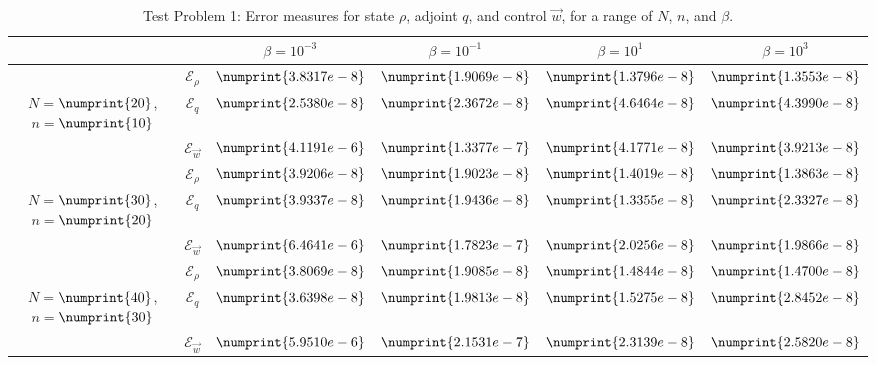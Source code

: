 \documentclass[11pt, a4paper]{article}
\theoremstyle{definition}
\newcommand{\adj}{q}
\begin{document}
	\begin{table}
		\begin{tabular}{ | c | c || c | c | c | c ||}
			\hline
			\multicolumn{2}{|c||}{} & $\beta = 10^{-3}$ & $\beta = 10^{-1}$ & $\beta = 10^{1}$ & $\beta = 10^{3}$  \\
			\hline
			\hline
			& $\mathcal{E}_\rho$ & $\numprint{3.8317e-8}$ & $\numprint{1.9069e-8}$ & $\numprint{1.3796e-8}$ & $\numprint{1.3553e-8}$ \\
			$N = $$\numprint{20}$, $n = $$\numprint{10}$  & $\mathcal{E}_\adj$ & $\numprint{2.5380e-8}$ & $\numprint{2.3672e-8}$ & $\numprint{4.6464e-8}$ & $\numprint{4.3990e-8}$ \\
			& $\mathcal{E}_{\vec{w}}$ & $\numprint{4.1191e-6}$ & $\numprint{1.3377e-7}$ & $\numprint{4.1771e-8}$ & $\numprint{3.9213e-8}$ \\
			\hline
			& $\mathcal{E}_\rho$ & $\numprint{3.9206e-8}$ & $\numprint{1.9023e-8}$ & $\numprint{1.4019e-8}$ & $\numprint{1.3863e-8}$ \\
			$N = $$\numprint{30}$, $n = $$\numprint{20}$  & $\mathcal{E}_\adj$ & $\numprint{3.9337e-8}$ & $\numprint{1.9436e-8}$ & $\numprint{1.3355e-8}$ & $\numprint{2.3327e-8}$ \\
			& $\mathcal{E}_{\vec{w}}$ & $\numprint{6.4641e-6}$ & $\numprint{1.7823e-7}$ & $\numprint{2.0256e-8}$ & $\numprint{1.9866e-8}$ \\
			\hline
			& $\mathcal{E}_\rho$ & $\numprint{3.8069e-8}$ & $\numprint{1.9085e-8}$ & $\numprint{1.4844e-8}$ & $\numprint{1.4700e-8}$ \\
			$N = $$\numprint{40}$, $n = $$\numprint{30}$  & $\mathcal{E}_\adj$ & $\numprint{3.6398e-8}$ & $\numprint{1.9813e-8}$ & $\numprint{1.5275e-8}$ & $\numprint{2.8452e-8}$ \\
			& $\mathcal{E}_{\vec{w}}$ & $\numprint{5.9510e-6}$ & $\numprint{2.1531e-7}$ & $\numprint{2.3139e-8}$ & $\numprint{2.5820e-8}$ \\
			\hline
		\end{tabular}
		\caption{Test Problem 1: Error measures for state $\rho$, adjoint $\adj$, and control $\vec{w}$, for a range of $N$, $n$, and $\beta$.}
		\label{TabA1:Prob1}
	\end{table}
\end{document}
